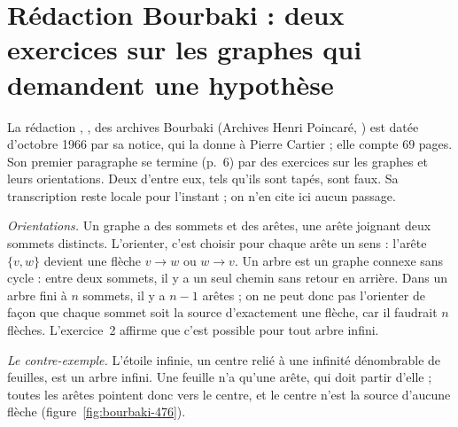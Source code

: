 \section[Rédaction Bourbaki \redac{476} : deux exercices sur les graphes]{Rédaction Bourbaki  : deux exercices sur les graphes qui demandent une hypothèse\protect{}}\label{sec:bourbaki-476}

La rédaction , , des archives Bourbaki (Archives Henri Poincaré, ) est datée d'octobre 1966 par sa notice, qui la donne à Pierre Cartier ; elle compte 69 pages. Son premier paragraphe se termine (p.~6) par des exercices sur les graphes et leurs orientations. Deux d'entre eux, tels qu'ils sont tapés, sont faux. Sa transcription reste locale pour l'instant ; on n'en cite ici aucun passage.

\emph{Orientations.} Un graphe a des sommets et des arêtes, une arête joignant deux sommets distincts. L'orienter, c'est choisir pour chaque arête un sens : l'arête $\{v, w\}$ devient une flèche $v \to w$ ou $w \to v$. Un arbre est un graphe connexe sans cycle : entre deux sommets, il y a un seul chemin sans retour en arrière. Dans un arbre fini à $n$ sommets, il y a $n - 1$ arêtes ; on ne peut donc pas l'orienter de façon que chaque sommet soit la source d'exactement une flèche, car il faudrait $n$ flèches. L'exercice~2 affirme que c'est possible pour tout arbre infini.

\emph{Le contre-exemple.} L'étoile infinie, un centre relié à une infinité dénombrable de feuilles, est un arbre infini. Une feuille n'a qu'une arête, qui doit partir d'elle ; toutes les arêtes pointent donc vers le centre, et le centre n'est la source d'aucune flèche (figure~\ref{fig:bourbaki-476}).

